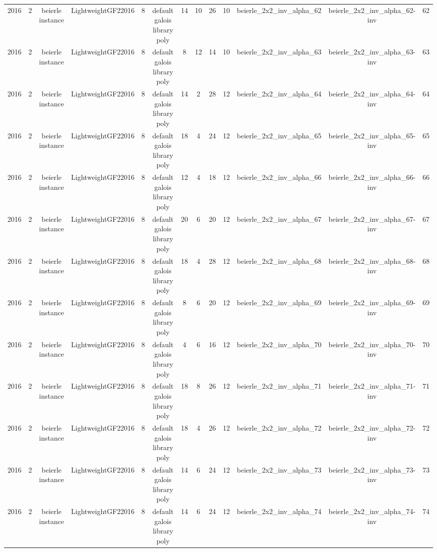 \begin{tabular}{c c c c c c c c c c c c c}
2016 & 2 & beierle instance & LightweightGF22016 & 8 & default galois library poly & 14 & 10 & 26 & 10 & beierle_2x2_inv_alpha_62 & beierle_2x2_inv_alpha_62-inv & 62 \\
2016 & 2 & beierle instance & LightweightGF22016 & 8 & default galois library poly & 8 & 12 & 14 & 10 & beierle_2x2_inv_alpha_63 & beierle_2x2_inv_alpha_63-inv & 63 \\
2016 & 2 & beierle instance & LightweightGF22016 & 8 & default galois library poly & 14 & 2 & 28 & 12 & beierle_2x2_inv_alpha_64 & beierle_2x2_inv_alpha_64-inv & 64 \\
2016 & 2 & beierle instance & LightweightGF22016 & 8 & default galois library poly & 18 & 4 & 24 & 12 & beierle_2x2_inv_alpha_65 & beierle_2x2_inv_alpha_65-inv & 65 \\
2016 & 2 & beierle instance & LightweightGF22016 & 8 & default galois library poly & 12 & 4 & 18 & 12 & beierle_2x2_inv_alpha_66 & beierle_2x2_inv_alpha_66-inv & 66 \\
2016 & 2 & beierle instance & LightweightGF22016 & 8 & default galois library poly & 20 & 6 & 20 & 12 & beierle_2x2_inv_alpha_67 & beierle_2x2_inv_alpha_67-inv & 67 \\
2016 & 2 & beierle instance & LightweightGF22016 & 8 & default galois library poly & 18 & 4 & 28 & 12 & beierle_2x2_inv_alpha_68 & beierle_2x2_inv_alpha_68-inv & 68 \\
2016 & 2 & beierle instance & LightweightGF22016 & 8 & default galois library poly & 8 & 6 & 20 & 12 & beierle_2x2_inv_alpha_69 & beierle_2x2_inv_alpha_69-inv & 69 \\
2016 & 2 & beierle instance & LightweightGF22016 & 8 & default galois library poly & 4 & 6 & 16 & 12 & beierle_2x2_inv_alpha_70 & beierle_2x2_inv_alpha_70-inv & 70 \\
2016 & 2 & beierle instance & LightweightGF22016 & 8 & default galois library poly & 18 & 8 & 26 & 12 & beierle_2x2_inv_alpha_71 & beierle_2x2_inv_alpha_71-inv & 71 \\
2016 & 2 & beierle instance & LightweightGF22016 & 8 & default galois library poly & 18 & 4 & 26 & 12 & beierle_2x2_inv_alpha_72 & beierle_2x2_inv_alpha_72-inv & 72 \\
2016 & 2 & beierle instance & LightweightGF22016 & 8 & default galois library poly & 14 & 6 & 24 & 12 & beierle_2x2_inv_alpha_73 & beierle_2x2_inv_alpha_73-inv & 73 \\
2016 & 2 & beierle instance & LightweightGF22016 & 8 & default galois library poly & 14 & 6 & 24 & 12 & beierle_2x2_inv_alpha_74 & beierle_2x2_inv_alpha_74-inv & 74 \\

\end{tabular}
